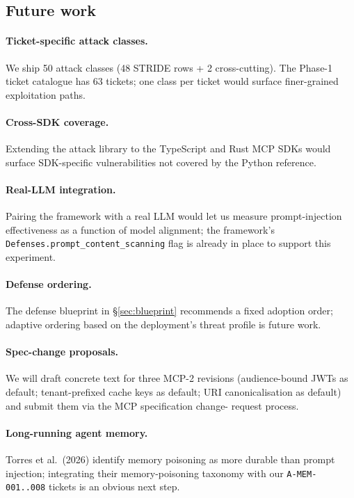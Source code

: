 \subsection{Future work}

\paragraph{Ticket-specific attack classes.} We ship 50 attack
classes (48 STRIDE rows + 2 cross-cutting). The Phase-1 ticket
catalogue has 63 tickets; one class per ticket would surface
finer-grained exploitation paths.

\paragraph{Cross-SDK coverage.} Extending the attack library
to the TypeScript and Rust MCP SDKs would surface SDK-specific
vulnerabilities not covered by the Python reference.

\paragraph{Real-LLM integration.} Pairing the framework with a
real LLM would let us measure prompt-injection effectiveness
as a function of model alignment; the framework's
\texttt{Defenses.prompt\_content\_scanning} flag is already
in place to support this experiment.

\paragraph{Defense ordering.} The defense blueprint in
\S\ref{sec:blueprint} recommends a fixed adoption order;
adaptive ordering based on the deployment's threat profile is
future work.

\paragraph{Spec-change proposals.} We will draft concrete text
for three MCP-2 revisions (audience-bound JWTs as default;
tenant-prefixed cache keys as default; URI canonicalisation as
default) and submit them via the MCP specification change-
request process.

\paragraph{Long-running agent memory.} Torres et al.~(2026)
identify memory poisoning as more durable than prompt
injection; integrating their memory-poisoning taxonomy with
our \texttt{A-MEM-001..008} tickets is an obvious next step.

